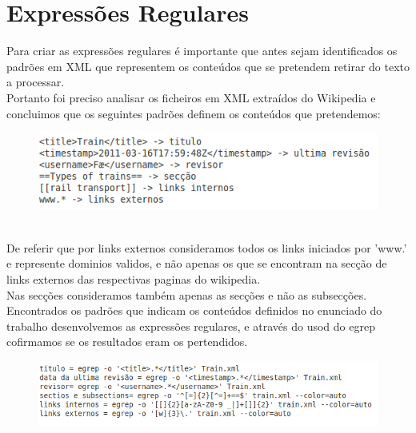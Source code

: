 \documentclass[a4paper,11pt,openright,openbib]{report}
\begin{document}
\section{Expressões Regulares}
Para criar as expressões regulares é importante que antes sejam identificados os padrões em XML que representem os conteúdos que se pretendem retirar do texto a processar.\\
Portanto foi preciso analisar os ficheiros em XML extraídos do Wikipedia e concluimos que os seguintes padrões definem os conteúdos que pretendemos:\\
\begin{figure}[!htb]
     \centering
     \includegraphics[scale=0.8]{imagens/er2.png}
	\label{Padrões das expressões}
\end{figure}  
	\\  
	
De referir que por links externos consideramos todos os links iniciados por 'www.' e represente dominios validos, e não apenas os que se encontram na secção de links externos das respectivas paginas do wikipedia.\\
Nas secções consideramos também apenas as secções e não as subsecções.\\


Encontrados os padrões que indicam os conteúdos definidos no enunciado do trabalho desenvolvemos as expressões regulares, e através do usod do egrep cofirmamos se os resultados eram os pertendidos.\\

\begin{figure}[!htb]
    \centering
    \includegraphics[scale=0.8]{imagens/er1.png}
\end{figure}  
\end{document}
